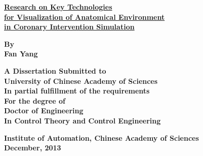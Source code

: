 
{\renewcommand{\baselinestretch}{1.0}

\thispagestyle{empty} %

\vspace*{0.5cm} %
\begin{center}
  {\xiaoerhao \hei \textsf{\textbf{\underline{Research on Key Technologies}\\
  \underline{for Visualization of Anatomical Environment}\\
  \underline{in Coronary Intervention Simulation}
  }}}
\end{center}

\vspace*{3.5cm} %
\begin{center}

\textsf{\sanhao \textrm{\textbf{By}}}\\
\textsf{\sanhao \textrm{\textbf{Fan Yang}}}

\vspace*{2.0cm} %
\xiaosihao \textrm{\textbf{ A Dissertation Submitted to\\
University of Chinese Academy of Sciences\\
In partial fulfillment of the requirements\\
For the degree of\\
Doctor of Engineering\\
In Control Theory and Control Engineering}}
\end{center}

\begin{center}
\vspace{1.5cm}
\xiaosihao \textrm{\textbf{Institute of Automation, Chinese Academy of Sciences}}\\
\wuhao \textrm{\textbf{December, 2013}}
\end{center}
} 